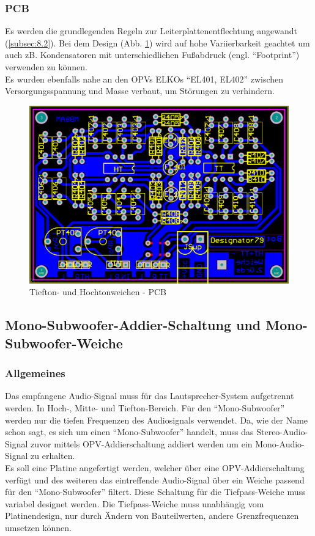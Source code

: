 \newpage
\subsubsection{PCB}\label{subsec:5.4.3}
Es werden die grundlegenden Regeln zur Leiterplattenentflechtung angewandt (\ref{subsec:8.2}).
Bei dem Design (Abb. \ref{fig:5.4.3.1}) wird auf hohe Variierbarkeit geachtet um auch zB. Kondensatoren mit unterschiedlichen Fußabdruck (engl. \enquote{Footprint}) verwenden zu können.\\
Es wurden ebenfalls nahe an den OPVs ELKOs \enquote{EL401, EL402} zwischen Versorgungsspannung und Masse verbaut, um Störungen zu verhindern.
\begin{figure} [H]
	\centering	
	\includegraphics[width=1\textwidth]{img/Print4/4_TTuHTWeiche-PCB.PNG}
	\caption{Tiefton- und Hochtonweichen - PCB}
	\label {fig:5.4.3.1}
\end{figure}


\newpage
\subsection*{Mono-Subwoofer-Addier-Schaltung und Mono-Subwoofer-Weiche}\label{sec:5.5}
\subsubsection{Allgemeines}\label{susec:5.5.1}
Das empfangene Audio-Signal muss für das Lautsprecher-System aufgetrennt werden. In Hoch-, Mitte- und Tiefton-Bereich.
Für den \enquote{Mono-Subwoofer} werden nur die tiefen Frequenzen des Audiosignals verwendet.
Da, wie der Name schon sagt, es sich um einen \enquote{Mono-Subwoofer} handelt, muss das Stereo-Audio-Signal zuvor mittels OPV-Addierschaltung addiert werden um ein Mono-Audio-Signal zu erhalten.\\
Es soll eine Platine angefertigt werden, welcher über eine OPV-Addierschaltung verfügt und des weiteren das eintreffende Audio-Signal über ein Weiche passend für den \enquote{Mono-Subwoofer} filtert.
Diese Schaltung für die Tiefpass-Weiche muss variabel designet werden. Die Tiefpass-Weiche muss unabhängig vom Platinendesign, nur durch Ändern von Bauteilwerten, andere Grenzfrequenzen umsetzen können.

